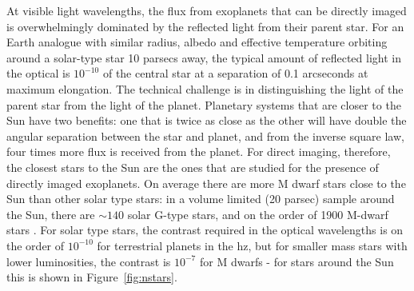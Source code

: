 \documentclass[letterpaper]{ar-1col}
\begin{document}
At visible light wavelengths, the flux from exoplanets that can be directly imaged is overwhelmingly dominated by the reflected light from their parent star.
%
For an Earth analogue with similar radius, albedo and effective temperature orbiting around a solar-type star 10 parsecs away, the typical amount of reflected light in the optical is $10^{-10}$ of the central star at a separation of 0.1 arcseconds at maximum elongation.
%
The technical challenge is in distinguishing the light of the parent star from the light of the planet.
%
Planetary systems that are closer to the Sun have two benefits: one that is twice as close as the other will have double the angular separation between the star and planet, and from the inverse square law, four times more flux is received from the planet.
%
For direct imaging, therefore, the closest stars to the Sun are the ones that are studied for the presence of directly imaged exoplanets.
%
On average there are more M dwarf stars close to the Sun than other solar type stars: in a volume limited (20 parsec) sample around the Sun, there are $\sim 140$ solar G-type stars, and on the order of 1900 M-dwarf stars \citep{Kirkpatrick24}.
%
For solar type stars, the contrast required in the optical wavelengths is on the order of $10^{-10}$ for terrestrial planets in the \ac{hz}, but for smaller mass stars with lower luminosities, the contrast is $10^{-7}$ for M dwarfs - for stars around the Sun this is shown in Figure~\ref{fig:nstars}.
\end{document}
